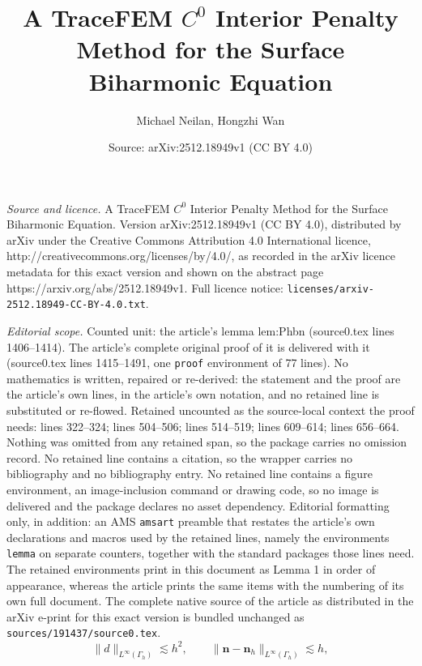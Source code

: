 \documentclass[10pt,a4paper]{amsart}
\title{A TraceFEM $C^0$ Interior Penalty Method for the Surface Biharmonic Equation}
\author{Michael Neilan, Hongzhi Wan}
\date{Source: arXiv:2512.18949v1 (CC BY 4.0)}
\newcommand{\bn}{{\bm n}}
\begin{document}
\maketitle

\noindent\emph{Source and licence.} A TraceFEM $C^0$ Interior Penalty Method for the Surface Biharmonic Equation. Version arXiv:2512.18949v1 (CC BY 4.0), distributed by arXiv under the Creative Commons Attribution 4.0 International licence, http://creativecommons.org/licenses/by/4.0/, as recorded in the arXiv licence metadata for this exact version and shown on the abstract page https://arxiv.org/abs/2512.18949v1. Full licence notice: \texttt{licenses/arxiv-2512.18949-CC-BY-4.0.txt}.\par\smallskip

\noindent\textit{Editorial scope.} Counted unit: the article's lemma lem:Phbn (source0.tex lines 1406--1414). The article's complete original proof of it is delivered with it (source0.tex lines 1415--1491, one \texttt{proof} environment of 77 lines). No mathematics is written, repaired or re-derived: the statement and the proof are the article's own lines, in the article's own notation, and no retained line is substituted or re-flowed.  Retained uncounted as the source-local context the proof needs: lines 322--324; lines 504--506; lines 514--519; lines 609--614; lines 656--664.  Nothing was omitted from any retained span, so the package carries no omission record.  No retained line contains a citation, so the wrapper carries no bibliography and no bibliography entry.  No retained line contains a figure environment, an image-inclusion command or drawing code, so no image is delivered and the package declares no asset dependency.  Editorial formatting only, in addition: an AMS \texttt{amsart} preamble that restates the article's own declarations and macros used by the retained lines, namely the environments \texttt{lemma} on separate counters, together with the standard packages those lines need.  The retained environments print in this document as Lemma 1 in order of appearance, whereas the article prints the same items with the numbering of its own full document.  The complete native source of the article as distributed in the arXiv e-print for this exact version is bundled unchanged as \texttt{sources/191437/source0.tex}.
\begin{equation}\label{eqn:GeomApprox}
\|d\|_{L^\infty(\Gamma_h)} \lesssim h^{2}, \qquad \|\bn - \bn_h\|_{L^\infty(\Gamma_h)} \lesssim h,
\end{equation}
\end{document}
